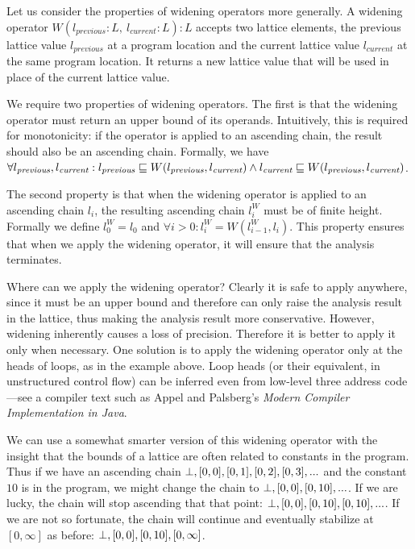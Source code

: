 \documentclass[11pt]{article}
\begin{document}
Let us consider the properties of widening operators more generally.  A widening operator $W(l_\textit{previous} {:} L,~ l_\textit{current} {:} L) : L$ accepts two lattice elements, the previous lattice value $l_\textit{previous}$ at a program location and the current lattice value $l_\textit{current}$ at the same program location.  It returns a new lattice value that will be used in place of the current lattice value.

We require two properties of widening operators.  The first is that the widening operator must return an upper bound of its operands.  Intuitively, this is required for monotonicity: if the operator is applied to an ascending chain, the result should also be an ascending chain.  Formally, we have $\forall l_\textit{previous}, l_\textit{current} : l_\textit{previous} \sqsubseteq W(l_\textit{previous}, l_\textit{current}) \land l_\textit{current} \sqsubseteq W(l_\textit{previous}, l_\textit{current})$.

The second property is that when the widening operator is applied to an ascending chain ${ l_i }$, the resulting ascending chain ${ l_i^W }$ must be of finite height.  Formally we define $l_0^W = l_0$ and $\forall i > 0 : l_i^W = W(l_{i-1}^W, l_i)$.  This property ensures that when we apply the widening operator, it will ensure that the analysis terminates.

Where can we apply the widening operator?  Clearly it is safe to apply anywhere, since it must be an upper bound and therefore can only raise the analysis result in the lattice, thus making the analysis result more conservative.  However, widening inherently causes a loss of precision.  Therefore it is better to apply it only when necessary.  One solution is to apply the widening operator only at the heads of loops, as in the example above.  Loop heads (or their equivalent, in unstructured control flow) can be inferred even from low-level three address code---see a compiler text such as Appel and Palsberg's \textit{Modern Compiler Implementation in Java}.

We can use a somewhat smarter version of this widening operator with the insight that the bounds of a lattice are often related to constants in the program.  Thus if we have an ascending chain $\bot, [0,0], [0,1], [0,2], [0,3], ...$ and the constant $10$ is in the program, we might change the chain to $\bot, [0,0], [0,10], ...$.  If we are lucky, the chain will stop ascending that that point: $\bot, [0,0], [0,10], [0, 10], ...$.  If we are not so fortunate, the chain will continue and eventually stabilize at $[0,\infty]$ as before: $\bot, [0,0], [0,10], [0,\infty]$.
\end{document}
